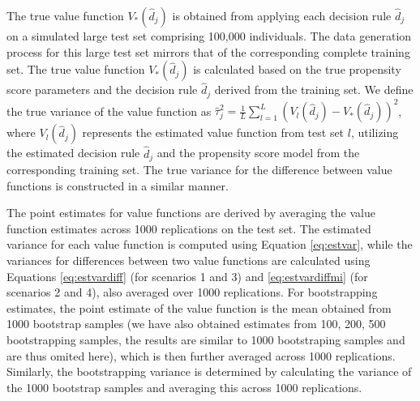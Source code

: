 \documentclass{article}
\begin{document}
The true value function $V_*(\hat{d}_{j})$ is obtained from applying each decision rule $\hat{d}_{j}$ on a simulated large test set comprising 100,000 individuals. The data generation process for this large test set mirrors that of the corresponding complete training set. The true value function $V_*(\hat{d}_{j})$ is calculated based on the true propensity score parameters and the decision rule $\hat{d}_{j}$ derived from the training set. We define the true variance of the value function as $\hat{\tau}_{j}^2 = \frac{1}{L} \sum_{l=1}^{L} (V_{l} (\hat{d}_{j}) -V_*(\hat{d}_{j}))^2$, where  $V_{l} (\hat{d}_{j}) $ represents the estimated value function from test set $l$, utilizing the estimated decision rule $\hat{d}_{j}$ and the propensity score model from the corresponding training set. The true variance for the difference between value functions is constructed in a similar manner. 

The point estimates for value functions are derived by averaging the value function estimates across 1000 replications on the test set. The estimated variance for each value function is computed using Equation \ref{eq:estvar}, while the variances for differences between two value functions are calculated using Equations \ref{eq:estvardiff} (for scenarios 1 and 3) and \ref{eq:estvardiffmi} (for scenarios 2 and 4), also averaged over 1000 replications. For bootstrapping estimates, the point estimate of the value function is the mean obtained from 1000 bootstrap samples (we have also obtained estimates from 100, 200, 500 bootstrapping samples, the results are similar to 1000 bootstraping samples and are thus omited here), which is then further averaged across 1000 replications. Similarly, the bootstrapping variance is determined by calculating the variance of the 1000 bootstrap samples and averaging this across 1000 replications.
\end{document}
